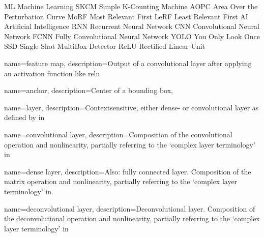
 {ML} {Machine Learning}
 {SKCM} {Simple K-Counting Machine}
 {AOPC} {Area Over the Perturbation Curve}
 {MoRF} {Most Relevant First}
 {LeRF} {Least Relevant First}
 {AI} {Artificial Intelligence}
 {RNN} {Recurrent Neural Network}
 {CNN} {Convolutional Neural Network}
 {FCNN} {Fully Convolutional Neural Network}
 {YOLO} {You Only Look Once}
 {SSD} {Single Shot MultiBox Detector}
 {ReLU} {Rectified Linear Unit}



 {
    name={feature map},
    description={Output of a convolutional layer after applying an activation function like \gls{relu}}
}

 {
    name={anchor},
    description={Center of a bounding box},
}

 {
    name={layer},
    description={Contextsensitive, either dense- or \gls{convolutional layer} 
    as defined by in}}

 {
    name={convolutional layer},
    description={Composition of the convolutional operation and nonlinearity, 
    partially referring to the `complex layer terminology' 
    in~\cite[341]{IanGoodfellow.2016}}
}

 {
    name={dense layer},
    description={Also: fully connected layer. Composition of the matrix operation and nonlinearity, partially referring to the `complex layer terminology' 
    in~\cite[341]{IanGoodfellow.2016}} 
}

 {
    name={deconvolutional layer},
    description={Deconvolutional layer. Composition of the deconvolutional 
    operation and nonlinearity, partially referring to the `complex layer 
    terminology' 
    in~\cite[341]{IanGoodfellow.2016}} 
}
